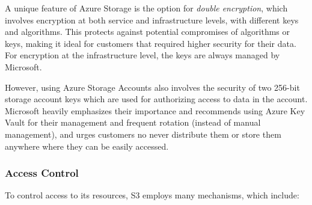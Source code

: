 A unique feature of Azure Storage is the option for \textit{double encryption}, which involves encryption at both service and infrastructure levels, with different keys and algorithms. This protects against potential compromises of algorithms or keys, making it ideal for customers that required higher security for their data. For encryption at the infrastructure level, the keys are always managed by Microsoft. ~\cite{blob_at_rest}

However, using Azure Storage Accounts also involves the security of two 256-bit storage account keys which are used for authorizing access to data in the account. Microsoft heavily emphasizes their importance and recommends using Azure Key Vault for their management and frequent rotation (instead of manual management), and urges customers no never distribute them or store them anywhere where they can be easily accessed.~ \cite {blob_account_keys}

\subsubsection{Access Control}
To control access to its resources, S3 employs many mechanisms, which include: ~\cite{s3faq, s3_access,s3_access_guidelines,s3_scp,s3_vpc,s3vsblobsecurity}

